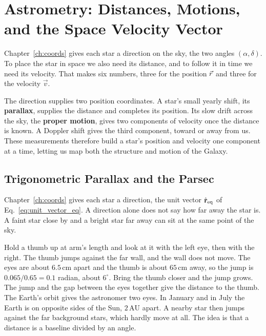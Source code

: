 \chapter{Astrometry: Distances, Motions, and the Space Velocity Vector}
\label{ch:astrometry}


Chapter~\ref{ch:coords} gives each star a direction on the sky, the two angles $(\alpha,\delta)$. To place the star in space we also need its distance, and to follow it in time we need its velocity. That makes six numbers, three for the position $\vec r$ and three for the velocity $\vec v$.

The direction supplies two position coordinates. A star's small yearly shift, its \textbf{parallax}, supplies the distance and completes its position. Its slow drift across the sky, the \textbf{proper motion}, gives two components of velocity once the distance is known. A Doppler shift gives the third component, toward or away from us. These measurements therefore build a star's position and velocity one component at a time, letting us map both the structure and motion of the Galaxy.

\section{Trigonometric Parallax and the Parsec}
\label{as:sec:parallax}

Chapter~\ref{ch:coords} gives each star a direction, the unit vector $\hat{\mathbf r}_{\rm eq}$ of Eq.~\eqref{eq:unit_vector_eq}. A direction alone does not say how far away the star is. A faint star close by and a bright star far away can sit at the same point of the sky.

Hold a thumb up at arm's length and look at it with the left eye, then with the right. The thumb jumps against the far wall, and the wall does not move. The eyes are about $6.5\,\mathrm{cm}$ apart and the thumb is about $65\,\mathrm{cm}$ away, so the jump is $0.065/0.65=0.1$ radian, about $6^\circ$. Bring the thumb closer and the jump grows. The jump and the gap between the eyes together give the distance to the thumb. The Earth's orbit gives the astronomer two eyes. In January and in July the Earth is on opposite sides of the Sun, $2\,\mathrm{AU}$ apart. A nearby star then jumps against the far background stars, which hardly move at all. The idea is that a distance is a baseline divided by an angle.

